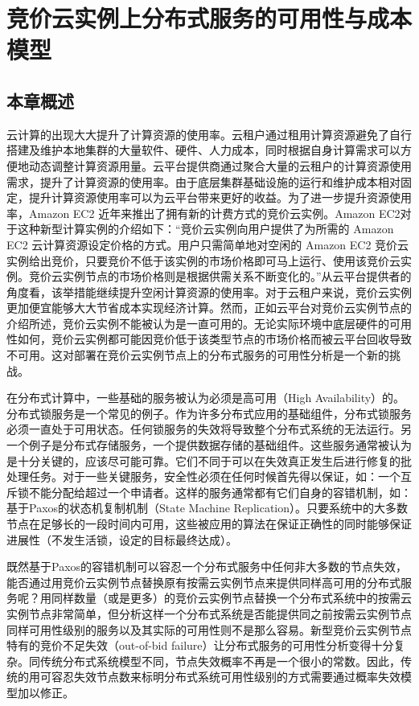 \chapter{竞价云实例上分布式服务的可用性与成本模型}
\label{cha:jupiter}

\section{本章概述}
\label{sec:jupiter_intro}
云计算的出现大大提升了计算资源的使用率。云租户通过租用计算资源避免了自行搭建及维护本地集群的大量软件、硬件、人力成本，同时根据自身计算需求可以方便地动态调整计算资源用量。云平台提供商通过聚合大量的云租户的计算资源使用需求，提升了计算资源的使用率。由于底层集群基础设施的运行和维护成本相对固定，提升计算资源使用率可以为云平台带来更好的收益。为了进一步提升资源使用率，Amazon EC2 近年来推出了拥有新的计费方式的竞价云实例。Amazon EC2对于这种新型计算实例的介绍如下：``竞价云实例向用户提供了为所需的 Amazon EC2 云计算资源设定价格的方式。用户只需简单地对空闲的 Amazon EC2 竞价云实例给出竞价，只要竞价不低于该实例的市场价格即可马上运行、使用该竞价云实例。竞价云实例节点的市场价格则是根据供需关系不断变化的。''从云平台提供者的角度看，该举措能继续提升空闲计算资源的使用率。对于云租户来说，竞价云实例更加便宜能够大大节省成本实现经济计算。然而，正如云平台对竞价云实例节点的介绍所述，竞价云实例不能被认为是一直可用的。无论实际环境中底层硬件的可用性如何，竞价云实例都可能因竞价低于该类型节点的市场价格而被云平台回收导致不可用。这对部署在竞价云实例节点上的分布式服务的可用性分析是一个新的挑战。

在分布式计算中，一些基础的服务被认为必须是高可用（High Availability）的。分布式锁服务是一个常见的例子。作为许多分布式应用的基础组件，分布式锁服务必须一直处于可用状态。任何锁服务的失效将导致整个分布式系统的无法运行。另一个例子是分布式存储服务，一个提供数据存储的基础组件。这些服务通常被认为是十分关键的，应该尽可能可靠。它们不同于可以在失效真正发生后进行修复的批处理任务\cite{5975137, Yi:2010:RCS:1844768.1845343}。对于一些关键服务，安全性必须在任何时候首先得以保证，如：一个互斥锁不能分配给超过一个申请者。这样的服务通常都有它们自身的容错机制，如：基于Paxos的状态机复制机制（State Machine Replication）。只要系统中的大多数节点在足够长的一段时间内可用，这些被应用的算法在保证正确性的同时能够保证进展性（不发生活锁，设定的目标最终达成）。

既然基于Paxos的容错机制可以容忍一个分布式服务中任何非大多数的节点失效，能否通过用竞价云实例节点替换原有按需云实例节点来提供同样高可用的分布式服务呢？用同样数量（或是更多）的竞价云实例节点替换一个分布式系统中的按需云实例节点非常简单，但分析这样一个分布式系统是否能提供同之前按需云实例节点同样可用性级别的服务以及其实际的可用性则不是那么容易。新型竞价云实例节点特有的竞价不足失效（out-of-bid failure）让分布式服务的可用性分析变得十分复杂。同传统分布式系统模型不同，节点失效概率不再是一个很小的常数。因此，传统的用可容忍失效节点数来标明分布式系统可用性级别的方式需要通过概率失效模型加以修正。

